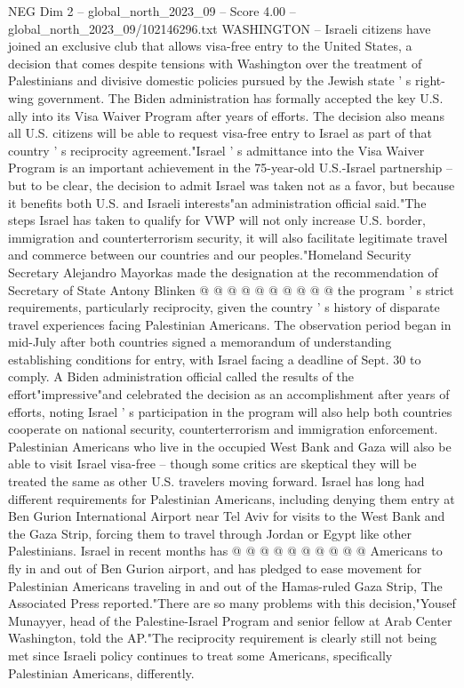 \begin{textsample}{NEG Dim 2 – global\_north\_2023\_09 – Score 4.00 – global\_north\_2023\_09/102146296.txt}  \label{ex:f2_neg_311}
WASHINGTON -- Israeli citizens have joined an exclusive club that allows visa-free entry to the United States, a decision that comes despite tensions with Washington over the treatment of Palestinians and divisive domestic policies pursued by the Jewish state ' s right-wing government.
The Biden administration has formally accepted the key U.S. ally into its Visa Waiver Program after years of efforts.
The decision also means all U.S. citizens will be able to request visa-free entry to Israel as part of that country ' s reciprocity agreement."Israel ' s admittance into the Visa Waiver Program is an important achievement in the 75-year-old U.S.-Israel partnership -- but to be clear, the decision to admit Israel was taken not as a favor, but because it benefits both U.S. and Israeli interests"an administration official said."The steps Israel has taken to qualify for VWP will not only increase U.S. border, immigration and counterterrorism security, it will also facilitate legitimate travel and commerce between our countries and our peoples."Homeland Security Secretary Alejandro Mayorkas made the designation at the recommendation of Secretary of State Antony Blinken @ @ @ @ @ @ @ @ @ @ the program ' s strict requirements, particularly reciprocity, given the country ' s history of disparate travel experiences facing Palestinian Americans.
The observation period began in mid-July after both countries signed a memorandum of understanding establishing conditions for entry, with Israel facing a deadline of Sept. 30 to comply.
A Biden administration official called the results of the effort"impressive"and celebrated the decision as an accomplishment after years of efforts, noting Israel ' s participation in the program will also help both countries cooperate on national security, counterterrorism and immigration enforcement.
Palestinian Americans who live in the occupied West Bank and Gaza will also be able to visit Israel visa-free -- though some critics are skeptical they will be treated the same as other U.S. travelers moving forward.
Israel has long had different requirements for Palestinian Americans, including denying them entry at Ben Gurion International Airport near Tel Aviv for visits to the West Bank and the Gaza Strip, forcing them to travel through Jordan or Egypt like other Palestinians.
Israel in recent months has @ @ @ @ @ @ @ @ @ @ Americans to fly in and out of Ben Gurion airport, and has pledged to ease movement for Palestinian Americans traveling in and out of the Hamas-ruled Gaza Strip, The Associated Press reported."There are so many problems with this decision,"Yousef Munayyer, head of the Palestine-Israel Program and senior fellow at Arab Center Washington, told the AP."The reciprocity requirement is clearly still not being met since Israeli policy continues to treat some Americans, specifically Palestinian Americans, differently.

\end{textsample}
